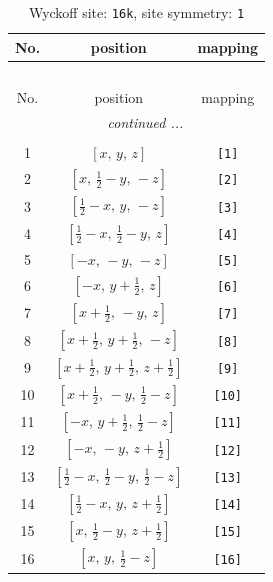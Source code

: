 \documentclass[fleqn,8pt]{jsarticle}
\begin{document}
\begin{longtable}{ccc}
\caption{Wyckoff site: {\tt 16k}, site symmetry: {\tt 1}}
 \\
 \hline \hline
No. & position & mapping \\ \hline \endfirsthead

\multicolumn{2}{l}{\tablename\ \thetable{}} \\
 \hline \hline
No. & position & mapping \\ \hline \endhead

 \hline \hline
\multicolumn{2}{r}{\footnotesize\it continued ...} \\ \endfoot

 \hline \hline
\multicolumn{2}{r}{} \\ \endlastfoot

1 & $\left[ x,\, y,\, z \right]$ & {\tt [1]} \\ \hline
2 & $\left[ x,\, \frac{1}{2} - y,\, - z \right]$ & {\tt [2]} \\ \hline
3 & $\left[ \frac{1}{2} - x,\, y,\, - z \right]$ & {\tt [3]} \\ \hline
4 & $\left[ \frac{1}{2} - x,\, \frac{1}{2} - y,\, z \right]$ & {\tt [4]} \\ \hline
5 & $\left[ - x,\, - y,\, - z \right]$ & {\tt [5]} \\ \hline
6 & $\left[ - x,\, y + \frac{1}{2},\, z \right]$ & {\tt [6]} \\ \hline
7 & $\left[ x + \frac{1}{2},\, - y,\, z \right]$ & {\tt [7]} \\ \hline
8 & $\left[ x + \frac{1}{2},\, y + \frac{1}{2},\, - z \right]$ & {\tt [8]} \\ \hline
9 & $\left[ x + \frac{1}{2},\, y + \frac{1}{2},\, z + \frac{1}{2} \right]$ & {\tt [9]} \\ \hline
10 & $\left[ x + \frac{1}{2},\, - y,\, \frac{1}{2} - z \right]$ & {\tt [10]} \\ \hline
11 & $\left[ - x,\, y + \frac{1}{2},\, \frac{1}{2} - z \right]$ & {\tt [11]} \\ \hline
12 & $\left[ - x,\, - y,\, z + \frac{1}{2} \right]$ & {\tt [12]} \\ \hline
13 & $\left[ \frac{1}{2} - x,\, \frac{1}{2} - y,\, \frac{1}{2} - z \right]$ & {\tt [13]} \\ \hline
14 & $\left[ \frac{1}{2} - x,\, y,\, z + \frac{1}{2} \right]$ & {\tt [14]} \\ \hline
15 & $\left[ x,\, \frac{1}{2} - y,\, z + \frac{1}{2} \right]$ & {\tt [15]} \\ \hline
16 & $\left[ x,\, y,\, \frac{1}{2} - z \right]$ & {\tt [16]} \\
\end{longtable}
\end{document}
